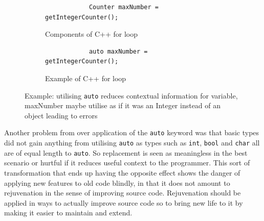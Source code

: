\documentclass[bsc,frontabs,singlespacing,twoside,parskip,deptreport]{infthesis}
\begin{document}
\begin{figure}[H]
    \centering

    \begin{subfigure}[h]{\textwidth}
        \centering
        \begin{verbatim}
            Counter maxNumber =  getIntegerCounter();
        \end{verbatim}
        \caption{Components of C++ for loop}
        \label{fig:type-context-before}
        \vspace{0.40cm}
    \end{subfigure}
    
    \begin{subfigure}[h]{\textwidth}
        \begin{verbatim}
            auto maxNumber =  getIntegerCounter();
        \end{verbatim}
        \caption{Example of C++ for loop}
        \centering
        \label{fig:type-context-after}
    \end{subfigure}

    \caption{Example: utilising \texttt{auto} reduces contextual information for variable, maxNumber maybe utilise as if it was an Integer instead of an object leading to errors}
    \label{fig:reduce-info-auto}
\end{figure}


Another problem from over application of the \texttt{auto} keyword was that basic types did not gain anything from utilising \texttt{auto} as types such as \texttt{int}, \texttt{bool} and \texttt{char} all are of equal length to \texttt{auto}. So replacement is seen as meaningless in the best scenario or hurtful if it reduces useful context to the programmer. This sort of transformation that ends up having the opposite effect shows the danger of applying new features to old code blindly, in that it does not amount to rejuvenation in the sense of improving source code. Rejuvenation should be applied in ways to actually improve source code so to bring new life to it by making it easier to maintain and extend. 
\end{document}
